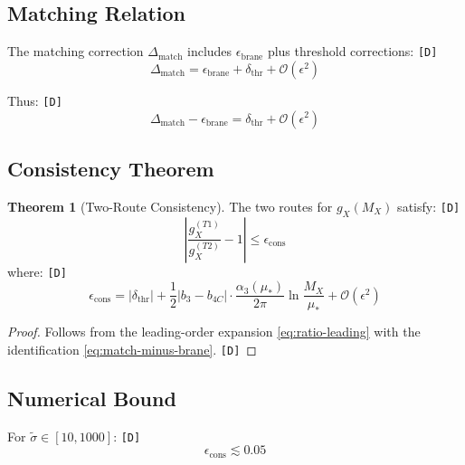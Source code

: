 \documentclass[11pt,a4paper]{article}
\newcommand{\tagD}{\textcolor{green!50!black}{\texttt{[D]}}}
\theoremstyle{definition}
\newtheorem{theorem}{Theorem}[section]
\begin{document}
\subsection{Matching Relation}
\label{subsec:matching-relation}

The matching correction $\Delta_{\text{match}}$ includes $\epsilon_{\text{brane}}$ plus
threshold corrections: \tagD{}
\begin{equation}
\label{eq:match-decompose}
\Delta_{\text{match}} = \epsilon_{\text{brane}} + \delta_{\text{thr}} + \mathcal{O}(\epsilon^2)
\end{equation}

Thus: \tagD{}
\begin{equation}
\label{eq:match-minus-brane}
\Delta_{\text{match}} - \epsilon_{\text{brane}} = \delta_{\text{thr}} + \mathcal{O}(\epsilon^2)
\end{equation}

\subsection{Consistency Theorem}
\label{subsec:consistency-theorem}

\begin{theorem}[Two-Route Consistency]
\label{thm:two-route-consistency}
The two routes for $g_X(M_X)$ satisfy: \tagD{}
\begin{equation}
\label{eq:consistency-theorem}
\boxed{\left|\frac{g_X^{(T1)}}{g_X^{(T2)}} - 1\right| \leq \epsilon_{\text{cons}}}
\end{equation}
where: \tagD{}
\begin{equation}
\label{eq:epsilon-cons-bound}
\epsilon_{\text{cons}} = |\delta_{\text{thr}}| + \frac{1}{2}|b_3 - b_{4C}| \cdot \frac{\alpha_3(\mu_*)}{2\pi} \ln\frac{M_X}{\mu_*} + \mathcal{O}(\epsilon^2)
\end{equation}
\end{theorem}

\begin{proof}
Follows from the leading-order expansion \cref{eq:ratio-leading} with the
identification \cref{eq:match-minus-brane}. \tagD{}
\end{proof}

\subsection{Numerical Bound}
\label{subsec:numerical-bound}

For $\tilde{\sigma} \in [10, 1000]$: \tagD{}
\begin{equation}
\label{eq:epsilon-cons-numerical}
\epsilon_{\text{cons}} \lesssim 0.05
\end{equation}
\end{document}
